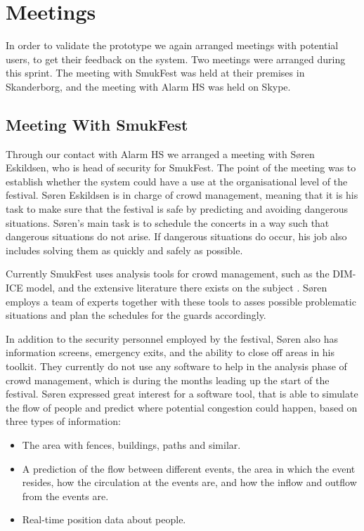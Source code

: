 \section{Meetings}

In order to validate the prototype we again arranged meetings with potential users, to get their feedback on the system. Two meetings were arranged during this sprint. The meeting with SmukFest was held at their premises in Skanderborg, and the meeting with Alarm HS was held on Skype. 

\subsection{Meeting With SmukFest}

Through our contact with Alarm HS we arranged a meeting with Søren Eskildsen, who is head of security for SmukFest. The point of the meeting was to establish whether the system could have a use at the organisational level of the festival. Søren Eskildsen is in charge of crowd management, meaning that it is his task to make sure that the festival is safe by predicting and avoiding dangerous situations. Søren's main task is to schedule the concerts in a way such that dangerous situations do not arise. If dangerous situations do occur, his job also includes solving them as quickly and safely as possible.

Currently SmukFest uses analysis tools for crowd management, such as the DIM-ICE model, and the extensive literature there exists on the subject \cite{}. Søren employs a team of experts together with these tools to asses possible problematic situations and plan the schedules for the guards accordingly.

In addition to the security personnel employed by the festival, Søren also has information screens, emergency exits, and the ability to close off areas in his toolkit. They currently do not use any software to help in the analysis phase of crowd management, which is during the months leading up the start of the festival. Søren expressed great interest for a software tool, that is able to simulate the flow of people and predict where potential congestion could happen, based on three types of information:

\begin{itemize}
    \item The area with fences, buildings, paths and similar.
    \item A prediction of the flow between different events, the area in which the event resides, how the circulation at the events are, and how the inflow and outflow from the events are.
    \item Real-time position data about people.

\end{itemize}

